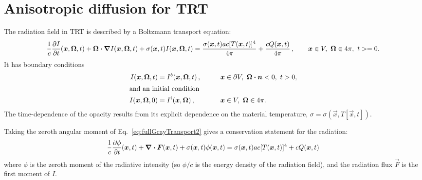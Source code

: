 
\newcommand{\epsiloncolor}[1]{#1}
\chapter{Anisotropic diffusion for TRT}
The radiation field in TRT is described by a Boltzmann transport equation:
\begin{equation}\label{eq:fullGrayTransport2}
  \frac{1}{c} \frac{\partial I}{\partial t}(\bm{x}, \bm{\Omega}, t)
  + \bm{\Omega} \bm{\cdot} \bm{\nabla} I(\bm{x}, \bm{\Omega}, t) +
 \sigma(\bm{x}, t) I(\bm{x}, \bm{\Omega}, t)
  = \frac{\sigma(\bm{x}, t) a c [T(\bm{x},t)]^4}{4\pi} 
  + \frac{c Q(\bm{x},t)}{4\pi} \,, \qquad \bm{x} \in V, \ \bm{\Omega} \in
  4\pi, \ t >= 0.
\end{equation}
It has boundary conditions
\begin{alignat*}{3}
  I(\bm{x}, \bm{\Omega}, t) &= I^b(\bm{x}, \bm{\Omega}, t) \,, &\qquad&
  \bm{x} \in \partial V, \  \bm{\Omega}\bm{\cdot} \bm{n} < 0, \ t > 0,
  \\
  \intertext{and an initial condition}
  I(\bm{x}, \bm{\Omega}, 0) &= I^i(\bm{x}, \bm{\Omega}) \,, &&
  \bm{x} \in V,\ \bm{\Omega} \in 4\pi.
\end{alignat*}
The time-dependence of the opacity results from its explicit dependence on
the material temperature, $\sigma = \sigma(\vec{x}, T[\vec{x},t])$.

Taking the zeroth angular moment of Eq.~\eqref{eq:fullGrayTransport2} gives a
conservation statement for the radiation:
\begin{equation} \label{eq:grayTransportZeroth}
  \frac{1}{c} \frac{\partial \phi}{\partial t}(\bm{x}, t)
  +\bm{\nabla} \bm{\cdot} \bm{F}(\bm{x}, t) +
 \sigma(\bm{x}, t) \phi(\bm{x}, t)
  = \sigma(\bm{x}, t) a c [T(\bm{x},t)]^4
  + c Q(\bm{x},t)
\end{equation}
where $\phi$ is the zeroth moment of the radiative intensity (so $\phi/c$ is
the energy density of the radiation field), and the radiation flux $\vec{F}$ is
the first moment of $I$.

